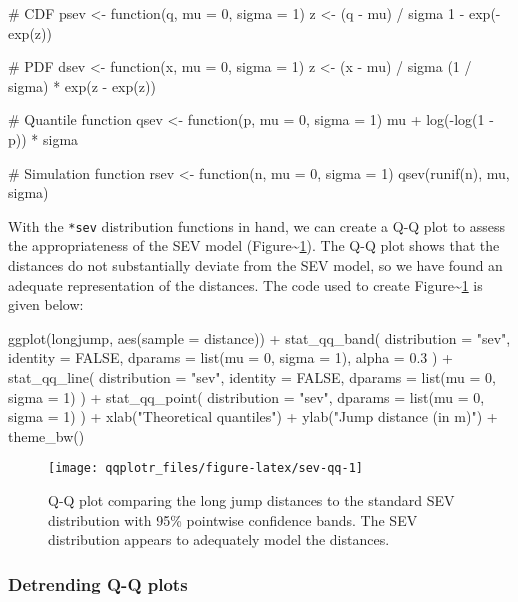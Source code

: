 \begin{Schunk}
\begin{Sinput}
# CDF
psev <- function(q, mu = 0, sigma = 1) {
    z <- (q - mu) / sigma
    1 - exp(-exp(z))
}

# PDF
dsev <- function(x, mu = 0, sigma = 1) {
  z <- (x - mu) / sigma
  (1 / sigma) * exp(z - exp(z))
}

# Quantile function
qsev <- function(p, mu = 0, sigma = 1) {
  mu + log(-log(1 - p)) * sigma
}

# Simulation function
rsev <- function(n, mu = 0, sigma = 1) {
  qsev(runif(n), mu, sigma)
}
\end{Sinput}
\end{Schunk}

With the \texttt{*sev} distribution functions in hand, we can create a
Q-Q plot to assess the appropriateness of the SEV model
(Figure\textasciitilde{}\ref{fig:sev-qq}). The Q-Q plot shows that the
distances do not substantially deviate from the SEV model, so we have
found an adequate representation of the distances. The code used to
create Figure\textasciitilde{}\ref{fig:sev-qq} is given below:

\begin{Schunk}
\begin{Sinput}
ggplot(longjump, aes(sample = distance)) +
  stat_qq_band(
    distribution = "sev", 
    identity = FALSE,
    dparams = list(mu = 0, sigma = 1), 
    alpha = 0.3
    ) +
  stat_qq_line(
    distribution = "sev", 
    identity = FALSE,
    dparams = list(mu = 0, sigma = 1)
    ) +
  stat_qq_point(
    distribution = "sev", 
    dparams = list(mu = 0, sigma = 1)
    ) +
  xlab("Theoretical quantiles") +
  ylab("Jump distance (in m)") +
  theme_bw()
\end{Sinput}
\begin{figure}

{\centering \texttt{[image: qqplotr\_files/figure-latex/sev-qq-1]} 

}

\caption[Q-Q plot comparing the long jump distances to the standard SEV distribution with 95\% pointwise confidence bands]{Q-Q plot comparing the long jump distances to the standard SEV distribution with 95\% pointwise confidence bands. The SEV distribution appears to adequately model the distances.}\label{fig:sev-qq}
\end{figure}
\end{Schunk}

\subsubsection{Detrending Q-Q plots}\label{detrending-q-q-plots}

